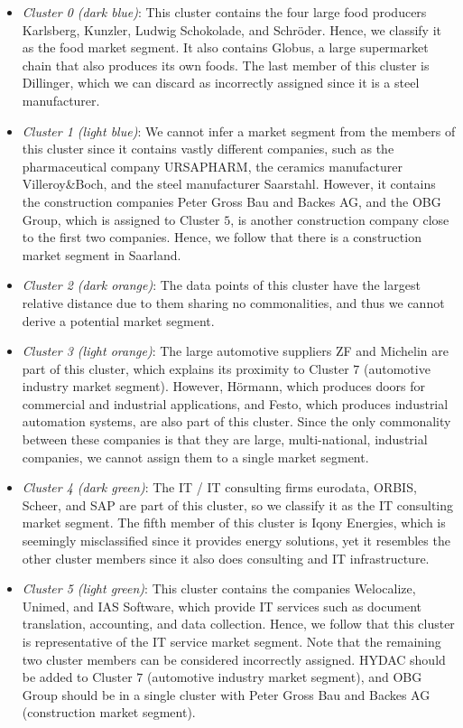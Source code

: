 \documentclass[conference]{IEEEtran}
\begin{document}
\begin{itemize}
    \item \textit{Cluster 0 (dark blue)}: This cluster contains the four large food producers Karlsberg, Kunzler, Ludwig Schokolade, and Schröder. Hence, we classify it as the food market segment. It also contains Globus, a large supermarket chain that also produces its own foods. The last member of this cluster is Dillinger, which we can discard as incorrectly assigned since it is a steel manufacturer.

    \item \textit{Cluster 1 (light blue)}: We cannot infer a market segment from the members of this cluster since it contains vastly different companies, such as the pharmaceutical company URSAPHARM, the ceramics manufacturer Villeroy\&Boch, and the steel manufacturer Saarstahl. However, it contains the construction companies Peter Gross Bau and Backes AG, and the OBG Group, which is assigned to Cluster $5$, is another construction company close to the first two companies. Hence, we follow that there is a construction market segment in Saarland.

    \item \textit{Cluster 2 (dark orange)}: The data points of this cluster have the largest relative distance due to them sharing no commonalities, and thus we cannot derive a potential market segment.

    \item \textit{Cluster 3 (light orange)}: The large automotive suppliers ZF and Michelin are part of this cluster, which explains its proximity to Cluster $7$ (automotive industry market segment). However, Hörmann, which produces doors for commercial and industrial applications, and Festo, which produces industrial automation systems, are also part of this cluster. Since the only commonality between these companies is that they are large, multi-national, industrial companies, we cannot assign them to a single market segment.

    \item \textit{Cluster 4 (dark green)}: The IT / IT consulting firms eurodata, ORBIS, Scheer, and SAP are part of this cluster, so we classify it as the IT consulting market segment. The fifth member of this cluster is Iqony Energies, which is seemingly misclassified since it provides energy solutions, yet it resembles the other cluster members since it also does consulting and IT infrastructure.

    \item \textit{Cluster 5 (light green)}: This cluster contains the companies Welocalize, Unimed, and IAS Software, which provide IT services such as document translation, accounting, and data collection. Hence, we follow that this cluster is representative of the IT service market segment. Note that the remaining two cluster members can be considered incorrectly assigned. HYDAC should be added to Cluster $7$ (automotive industry market segment), and OBG Group should be in a single cluster with Peter Gross Bau and Backes AG (construction market segment).


\end{itemize}
\end{document}
